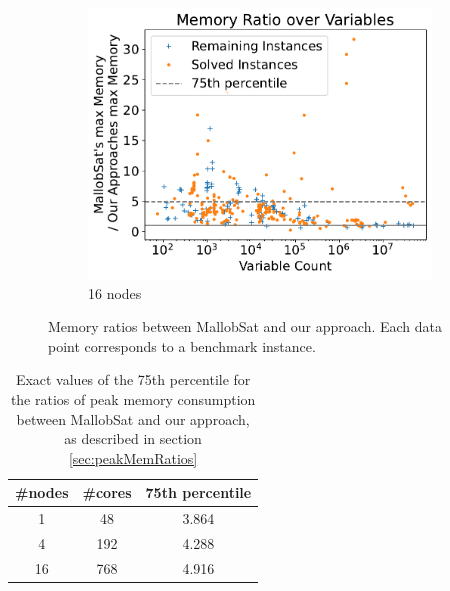 \documentclass[12pt,a4paper,twoside]{scrartcl}
\numberwithin{equation}{section}
\begin{document}
\begin{figure}[!h]
\begin{subfigure}[c]{.45\textwidth}
    \center
    \includegraphics[scale=.45]{plots/16node_compare/mem_ratio_over_vars.pdf}
    \caption{16 nodes}
    \label{fig:memRatiosVars16node}
  \end{subfigure}
  \caption{Memory ratios between MallobSat and our approach. Each data point corresponds to a benchmark instance.}
  \label{fig:memRatiosVars}
\end{figure}

\begin{table}[!h]
  \center
  \begin{tabular}{ ccc }
    \toprule
    \#nodes & \#cores & 75th percentile \\
    \midrule
    1  & 48  & 3.864\\
    4  & 192 & 4.288\\
    16 & 768 & 4.916\\
    \bottomrule
  \end{tabular}
  \caption{Exact values of the 75th percentile for the ratios of peak memory consumption between MallobSat and our approach, as described in section \ref{sec:peakMemRatios}}
  \label{tab:memRatioPercentiles}
\end{table}
\end{document}
